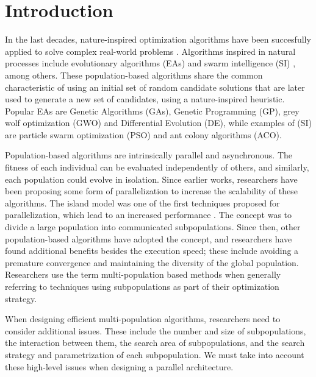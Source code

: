 \documentclass[review]{elsarticle}
\begin{document}
\linenumbers

\section{Introduction}

In the last decades, nature-inspired optimization algorithms have been succesfully
applied to solve complex real-world problems \cite{yang2014nature}. Algorithms
inspired in natural processes include evolutionary algorithms (EAs)
\cite{back1996evolutionary} and swarm intelligence (SI) \cite{kennedy2006swarm},
among others. These population-based algorithms share the common characteristic
of using an initial set of random candidate solutions that are later used to
generate a new set of candidates, using a nature-inspired heuristic. Popular EAs
are Genetic Algorithms (GAs), Genetic Programming (GP), grey wolf optimization
(GWO) and Differential Evolution (DE), while examples of (SI) are particle swarm
optimization (PSO) and ant colony algorithms (ACO).

Population-based algorithms are intrinsically parallel and
asynchronous. The fitness of each individual can be evaluated independently of
others, and similarly, each population could evolve in isolation. Since 
earlier works, researchers have been proposing some form of parallelization
\cite{muhlenbein1988evolution} to increase the scalability of these algorithms.
The island model was one of the first techniques proposed for parallelization,
which lead to an increased performance \cite{gorges1990explicit,grosso1985computer}. 
The concept was to divide a large population into communicated subpopulations. 
Since then, other population-based algorithms have adopted the concept, 
and researchers have found additional benefits
besides the execution speed; these include avoiding a premature convergence and
maintaining the diversity of the global population. Researchers use the term
multi-population based methods when generally referring to techniques using
subpopulations as part of their optimization strategy.

When designing efficient multi-population algorithms, researchers need to
consider additional issues. These include the number and size of subpopulations,
the interaction between them, the search area of subpopulations, and the search
strategy and parametrization of each subpopulation. We must take into account
these high-level issues when designing a parallel architecture. 
\end{document}
